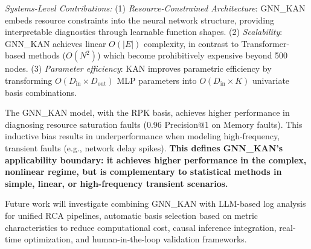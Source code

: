 \documentclass[conference]{IEEEtran}
\begin{document}
\textit{Systems-Level Contributions:} (1) \textit{Resource-Constrained Architecture}: GNN\_KAN embeds resource constraints into the neural network structure, providing interpretable diagnostics through learnable function shapes. (2) \textit{Scalability}: GNN\_KAN achieves linear $O(|E|)$ complexity, in contrast to Transformer-based methods ($O(N^2)$) which become prohibitively expensive beyond 500 nodes. (3) \textit{Parameter efficiency}: KAN improves parametric efficiency by transforming $O(D_{\text{in}} \times D_{\text{out}})$ MLP parameters into $O(D_{\text{in}} \times K)$ univariate basis combinations.

The GNN\_KAN model, with the RPK basis, achieves higher performance in diagnosing resource saturation faults (0.96 Precision@1 on Memory faults). This inductive bias results in underperformance when modeling high-frequency, transient faults (e.g., network delay spikes). \textbf{This defines GNN\_KAN's applicability boundary: it achieves higher performance in the complex, nonlinear regime, but is complementary to statistical methods in simple, linear, or high-frequency transient scenarios.}

Future work will investigate combining GNN\_KAN with LLM-based log analysis for unified RCA pipelines, automatic basis selection based on metric characteristics to reduce computational cost, causal inference integration, real-time optimization, and human-in-the-loop validation frameworks.
\end{document}
